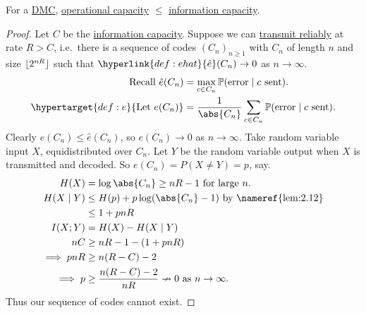 \documentclass{article}
\DeclarePairedDelimiter{\floor}{\lfloor}{\rfloor}
\newcommand{\Prob}{\mathbb{P}}
\newcommand{\1}[1]{\mathbbm{1}_{#1}}
\begin{document}
\begin{nprop}\label{prop:2.15}
    For a \hyperlink{def:dmc}{DMC}, \hyperlink{def:capacity}{operational capacity} $\leq$ \hyperlink{def:infoChannelCapacity}{information capacity}.
\end{nprop}
\begin{proof}
    Let $C$ be the \hyperlink{def:infoChannelCapacity}{information capacity}.
    Suppose we can \hyperlink{def:relTrans}{transmit reliably} at rate $R > C$, i.e.\ there is a sequence of codes $(C_n)_{n \geq 1}$ with $C_n$ of length $n$ and size $\floor{2^{nR}}$ such that $\hyperlink{def:ehat}{\hat{e}}(C_n) \to 0$ as $n \to \infty$.
    \begin{align*}
        \text{Recall } \hat{e}(C_n) &= \max_{c \in C_n} \Prob(\text{error} \mid c \text{ sent}). \\
        \hypertarget{def:e}{\text{Let } e(C_n)} &= \frac{1}{\abs{C_n}} \sum_{c \in C_n} \Prob(\text{error} \mid c \text{ sent}).
    \end{align*}
    Clearly $e(C_n) \leq \hat{e}(C_n)$, so $e(C_n) \to 0$ as $n \to \infty$.
    Take random variable input $X$, equidistributed over $C_n$.
    Let $Y$ be the random variable output when $X$ is transmitted and decoded.
    So $e(C_n) = P(X \neq Y) = p$, say.
    \begin{align*}
        H(X) &= \log \abs{C_n} \geq n R - 1 \text{ for large } n. \\
        H(X \mid Y) &\leq H(p) + p \log(\abs{C_n} - 1) \text{ by \nameref{lem:2.12}} \\
                    &\leq 1 + pnR \\
        I(X;Y)&= H(X) - H(X \mid Y) \\
        n C &\geq n R - 1 - (1 + p n R) \\
        \implies p n R &\geq n(R-C) - 2 \\
        \implies p &\geq \frac{n(R-C) - 2}{nR} \nrightarrow 0 \text{ as } n \to \infty.
    \end{align*}
    Thus our sequence of codes cannot exist.
\end{proof}
\end{document}
